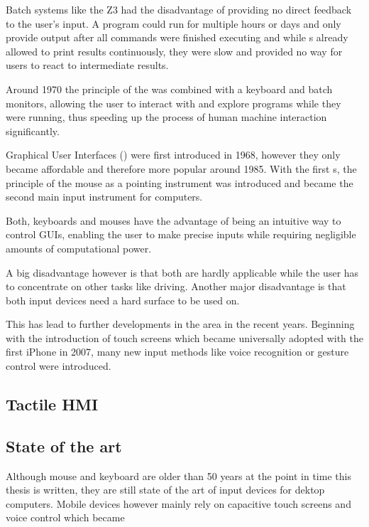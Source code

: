 Batch systems like the Z3 had the disadvantage of providing no direct feedback to the user's input. A program could run for multiple hours or days and only provide output after all commands were finished executing and while s already allowed to print results continuously, they were slow and provided no way for users to react to intermediate results. 

Around 1970 the principle of the  was combined with a keyboard and batch monitors, allowing the user to interact with and explore programs while they were running, thus speeding up the process of human machine interaction significantly.

Graphical User Interfaces () were first introduced in 1968, however they only became affordable and therefore more popular around 1985. With the first s, the principle of the mouse as a pointing instrument was introduced and became the second main input instrument for computers. 

Both, keyboards and mouses have the advantage of being an intuitive way to control GUIs, enabling the user to make precise inputs while requiring negligible amounts of computational power. 

A big disadvantage however is that both are hardly applicable while the user has to concentrate on other tasks like driving. Another major disadvantage is that both input devices need a hard surface to be used on. 

This has lead to further developments in the area in the recent years. Beginning with the introduction of touch screens which became universally adopted with the first iPhone in 2007, many new input methods like voice recognition or gesture control were introduced. 



	\subsection{Tactile HMI}

	\subsection{State of the art}
	
	Although mouse and keyboard are older than 50 years at the point in time this thesis is written, they are still state of the art of input devices for dektop computers. Mobile devices however mainly rely on capacitive touch screens and voice control which became 
			
